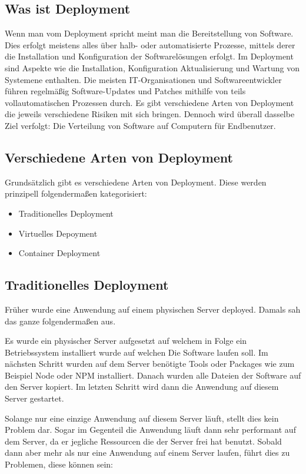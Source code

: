 \subsection{Was ist Deployment}

Wenn man vom Deployment spricht meint man die Bereitstellung von Software. Dies erfolgt meistens alles über halb- oder automatisierte Prozesse, mittels derer die Installation und Konfiguration der Softwarelösungen erfolgt. Im Deployment sind Aspekte wie die Installation, Konfiguration Aktualisierung und Wartung von Systemene enthalten.
Die meisten IT-Organisationen und Softwareentwickler führen regelmäßig Software-Updates und Patches mithilfe von teils vollautomatischen Prozessen durch. Es gibt verschiedene Arten von Deployment die jeweils verschiedene Risiken mit sich bringen. Dennoch wird überall dasselbe Ziel verfolgt: Die Verteilung von Software auf Computern für Endbenutzer.
\cite{Deployment}


\subsection{Verschiedene Arten von Deployment}

Grundsätzlich gibt es verschiedene Arten von Deployment. Diese werden prinzipell folgendermaßen kategorisiert:
    \begin{itemize}
    \item Traditionelles Deployment
    \item Virtuelles Depoyment
    \item Container Deployment
    \end{itemize}

\subsection{Traditionelles Deployment}

Früher wurde eine Anwendung auf einem physischen Server deployed. Damals sah das ganze folgendermaßen aus.

Es wurde ein physischer Server aufgesetzt auf welchem in Folge ein Betriebssystem installiert wurde auf welchen Die Software laufen soll. Im nächsten Schritt wurden auf dem Server benötigte Tools oder Packages wie zum Beispiel Node oder NPM installiert. Danach wurden alle Dateien der Software auf den Server kopiert. Im letzten Schritt wird dann die Anwendung auf diesem Server gestartet.


Solange nur eine einzige Anwendung auf diesem Server läuft, stellt dies kein Problem dar. Sogar im Gegenteil die Anwendung läuft dann sehr performant auf dem Server, da er jegliche Ressourcen die der Server frei hat benutzt. Sobald dann aber mehr als nur eine Anwendung auf einem Server laufen, führt dies zu Problemen, diese können sein:

